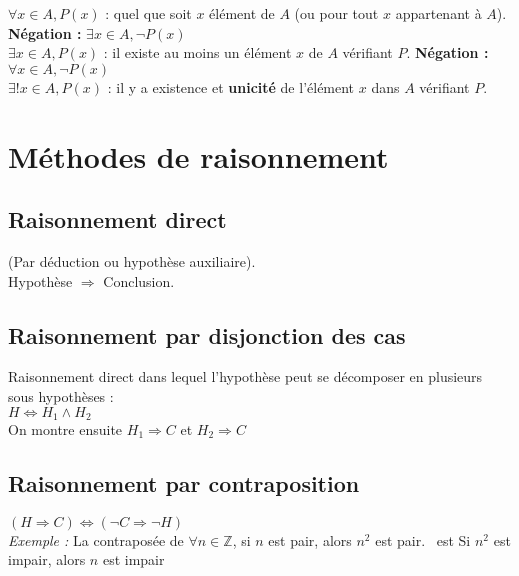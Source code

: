     $\forall x \in A, P(x)$ : quel que soit $x$ élément de $A$ (ou pour tout $x$ appartenant à $A$). \hfill \textbf{Négation :} $\exists x \in A, \neg P(x)$\\
    $\exists x \in A, P(x)$ : il existe au moins un élément $x$ de $A$ vérifiant $P$. \hfill \textbf{Négation :} $\forall x \in A, \neg P(x)$\\
    $\exists !x \in A, P(x)$ : il y a existence et \textbf{unicité} de l'élément $x$ dans $A$ vérifiant $P$.


\section{Méthodes de raisonnement}\label{sec:methodes-de-raisonnement}
  
  \begin{multicols}{2}
    \raggedcolumns
    
    \subsection{Raisonnement direct}\label{subsec:raisonnement-direct}
      
      (Par déduction ou hypothèse auxiliaire).\\
      Hypothèse $\Rightarrow$ Conclusion.
    
    \subsection{Raisonnement par disjonction des cas}\label{subsec:raisonnement-par-disjonction-des-cas}
      
      Raisonnement direct dans lequel l'hypothèse peut se décomposer en plusieurs sous hypothèses :\\
      $H \Leftrightarrow H_1 \land H_2$\\
      On montre ensuite $H_1 \Rightarrow C$ et $H_2 \Rightarrow C$
    
    \subsection{Raisonnement par contraposition}\label{subsec:raisonnement-par-contraposition}
      
      $(H \Rightarrow C) \Leftrightarrow (\neg C \Rightarrow \neg H)$\\
      \textit{Exemple :} La contraposée de \og $\forall n \in \mathbb{Z}$, si $n$ est pair, alors $n^2$ est pair. \fg\ est \og Si $n^2$ est impair, alors $n$ est impair \fg
    

\end{multicols}
